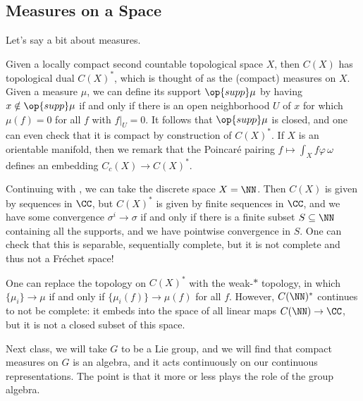 \documentclass[../notes.tex]{subfiles}
\begin{document}
\subsection{Measures on a Space}
Let's say a bit about measures.
\begin{remark} \label{rem:measures-on-top-grp}
	Given a locally compact second countable topological space $X$, then $C(X)$ has topological dual $C(X)^*$, which is thought of as the (compact) measures on $X$. Given a measure $\mu$, we can define its support $\op{supp}\mu$ by having $x\notin\op{supp}\mu$ if and only if there is an open neighborhood $U$ of $x$ for which $\mu(f)=0$ for all $f$ with $f|_U=0$. It follows that $\op{supp}\mu$ is closed, and one can even check that it is compact by construction of $C(X)^*$. If $X$ is an orientable manifold, then we remark that the Poincar\'e pairing $f\mapsto\int_Xf\varphi\,\omega$ defines an embedding $C_c(X)\to C(X)^*$.
\end{remark}
\begin{nex}
	Continuing with , we can take the discrete space $X=\NN$. Then $C(X)$ is given by sequences in $\CC$, but $C(X)^*$ is given by finite sequences in $\CC$, and we have some convergence $\sigma^i\to\sigma$ if and only if there is a finite subset $S\subseteq\NN$ containing all the supports, and we have pointwise convergence in $S$. One can check that this is separable, sequentially complete, but it is not complete and thus not a Fr\'echet space!
\end{nex}
\begin{remark}
	One can replace the topology on $C(X)^*$ with the weak-$*$ topology, in which $\{\mu_i\}\to\mu$ if and only if $\{\mu_i(f)\}\to\mu(f)$ for all $f$. However, $C(\NN)^*$ continues to not be complete: it embeds into the space of all linear maps $C(\NN)\to\CC$, but it is not a closed subset of this space.
\end{remark}
Next class, we will take $G$ to be a Lie group, and we will find that compact measures on $G$ is an algebra, and it acts continuously on our continuous representations. The point is that it more or less plays the role of the group algebra.
\end{document}
